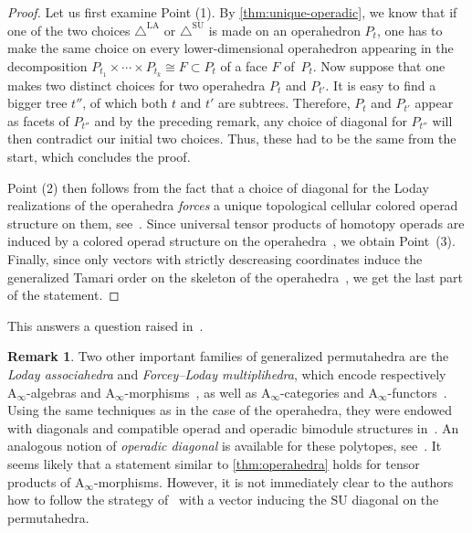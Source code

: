 \documentclass{amsart}
\theoremstyle{definition}
\newtheorem{remark}[theorem]{Remark}
\newcommand{\SU}{\mathrm{SU}}
\newcommand{\SUD}{\triangle^{\mathrm{SU}}}
\newcommand{\LAD}{\triangle^{\mathrm{LA}}}
\newcommand{\Ainf}{\ensuremath{\mathrm{A}_\infty}}
\begin{document}
\begin{proof}
Let us first examine Point (1).
By \cref{thm:unique-operadic}, we know that if one of the two choices $\LAD$ or $\SUD$ is made on an operahedron $P_t$, one has to make the same choice on every lower-dimensional operahedron appearing in the decomposition $P_{t_1} \times \cdots \times P_{t_k} \cong F \subset P_t$ of a face $F$ of~$P_t$. 
Now suppose that one makes two distinct choices for two operahedra $P_t$ and $P_{t'}$.
It is easy to find a bigger tree $t''$, of which both $t$ and $t'$ are subtrees.
Therefore, $P_t$ and $P_{t'}$ appear as facets of $P_{t''}$ and by the preceding remark, any choice of diagonal for $P_{t''}$ will then contradict our initial two choices. 
Thus, these had to be the same from the start, which concludes the proof. 

Point (2) then follows from the fact that a choice of diagonal for the Loday realizations of the operahedra \emph{forces} a unique topological cellular colored operad structure on them, see~\cite[Thm.~4.18]{LaplanteAnfossi}.
Since universal tensor products of homotopy operads are induced by a colored operad structure on the operahedra~\cite[Coro.~4.24]{LaplanteAnfossi}, we obtain Point~(3).
Finally, since only vectors with strictly descreasing coordinates induce the generalized Tamari order on the skeleton of the operahedra~\cite[Prop.~3.11]{LaplanteAnfossi}, we get the last part of the statement. 
\end{proof}

This answers a question raised in~\cite[Rem.~3.14]{LaplanteAnfossi}.

\begin{remark}
Two other important families of generalized permutahedra are the \emph{Loday associahedra} and \emph{Forcey--Loday multiplihedra}, which encode respectively $\Ainf$-algebras and $\Ainf$-morphisms~\cite[Prop.~4.9]{LaplanteAnfossiMazuir}, as well as $\Ainf$-categories and $\Ainf$-functors~\cite[Sect.~4.3]{LaplanteAnfossiMazuir}.
Using the same techniques as in the case of the operahedra, they were endowed with diagonals and compatible operad and operadic bimodule structures in~\cite[Thm.~1]{LaplanteAnfossiMazuir}.
An analogous notion of \emph{operadic diagonal} is available for these polytopes, see~\cite[Prop.~2.14]{LaplanteAnfossiMazuir}.
It seems likely that a statement similar to \cref{thm:operahedra} holds for tensor products of $\Ainf$-morphisms. 
However, it is not immediately clear to the authors how to follow the strategy of~\cite{LaplanteAnfossiMazuir} with a vector inducing the $\SU$ diagonal on the permutahedra.
\end{remark}
\end{document}
